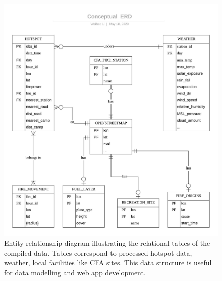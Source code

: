\documentclass[11pt,a4paper,]{article}
\begin{document}
\begin{figure}
\centering
\includegraphics{figures/Shiny_app_data_Conceptual_ERD.jpeg}
\caption{Entity relationship diagram illustrating the relational tables of the compiled data. Tables correspond to processed hotspot data, weather, local facilities like CFA sites. This data structure is useful for data modelling and web app development. \label{fig:ERD}}
\end{figure}
\end{document}
